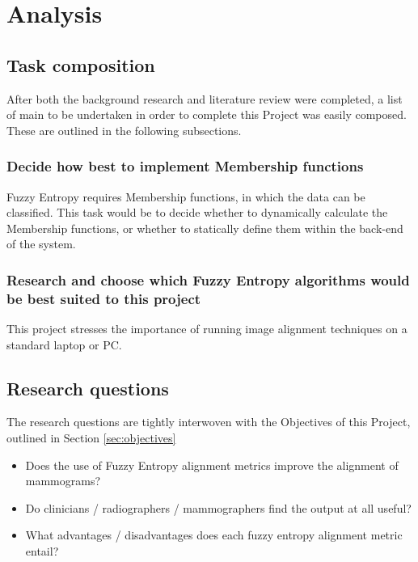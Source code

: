 \section{Analysis}

\subsection{Task composition}

After both the background research and literature review were completed, a list of main  to be undertaken in order to complete this Project was easily composed. These are outlined in the following subsections.

\subsubsection{Decide how best to implement Membership functions}

Fuzzy Entropy requires Membership functions, in which the data can be classified. This task would be to decide whether to dynamically calculate the Membership functions, or whether to statically define them within the back-end of the system.

\subsubsection{Research and choose which Fuzzy Entropy algorithms would be best suited to this project}

This project stresses the importance of running image alignment techniques on a standard laptop or PC.

\subsection{Research questions}

The research questions are tightly interwoven with the Objectives of this Project, outlined in Section \ref{sec:objectives}

\begin{itemize}
  \item Does the use of Fuzzy Entropy alignment metrics improve the alignment of mammograms?
  \item Do clinicians / radiographers / mammographers find the output at all useful?
  \item What advantages / disadvantages does each fuzzy entropy alignment metric entail?
\end{itemize}
